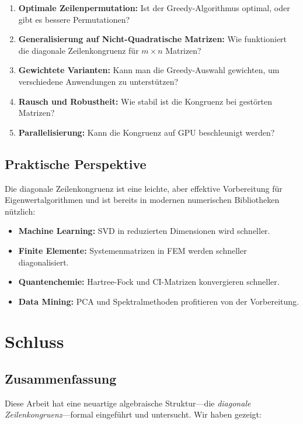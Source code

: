 \documentclass[a4paper,12pt]{article}
\theoremstyle{definition}
\begin{document}
\begin{enumerate}
	\item \textbf{Optimale Zeilenpermutation:} Ist der Greedy-Algorithmus optimal, oder gibt es bessere Permutationen?
	\item \textbf{Generalisierung auf Nicht-Quadratische Matrizen:} Wie funktioniert die diagonale Zeilenkongruenz für $m \times n$ Matrizen?
	\item \textbf{Gewichtete Varianten:} Kann man die Greedy-Auswahl gewichten, um verschiedene Anwendungen zu unterstützen?
	\item \textbf{Rausch und Robustheit:} Wie stabil ist die Kongruenz bei gestörten Matrizen?
	\item \textbf{Parallelisierung:} Kann die Kongruenz auf GPU beschleunigt werden?
\end{enumerate}

\subsection{Praktische Perspektive}

Die diagonale Zeilenkongruenz ist eine leichte, aber effektive Vorbereitung für Eigenwertalgorithmen und ist bereits in modernen numerischen Bibliotheken nützlich:

\begin{itemize}
	\item \textbf{Machine Learning:} SVD in reduzierten Dimensionen wird schneller.
	\item \textbf{Finite Elemente:} Systemenmatrizen in FEM werden schneller diagonalisiert.
	\item \textbf{Quantenchemie:} Hartree-Fock und CI-Matrizen konvergieren schneller.
	\item \textbf{Data Mining:} PCA und Spektralmethoden profitieren von der Vorbereitung.
\end{itemize}

\section{Schluss}

\subsection{Zusammenfassung}
Diese Arbeit hat eine neuartige algebraische Struktur—die \emph{diagonale Zeilenkongruenz}—formal eingeführt und untersucht. Wir haben gezeigt:
\end{document}
